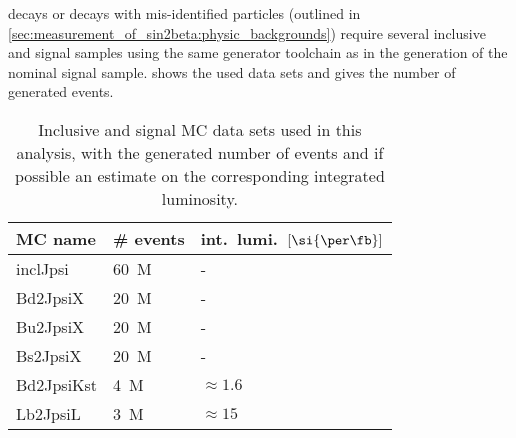 decays or decays with mis-identified particles (outlined in
\cref{sec:measurement_of_sin2beta:physic_backgrounds}) require several inclusive
and signal \MC samples using the same generator toolchain as in the generation
of the nominal signal \MC sample.
 shows
the used \MC data sets and gives the number of generated events.
%
\begin{table}
\centering
\caption{Inclusive and signal MC data sets used in this analysis, with the
generated number of events and if possible an estimate on the corresponding
integrated luminosity.}
\label{tab:measurement_of_sin2beta:data_preparation:datasamples:mc:samples}
\begin{tabular}{lll}
\toprule
\acs{MC} name & \# events & int.\ lumi.\ $[\si{\per\fb}]$ \\ 
\midrule
inclJpsi    & \SI{60}{M} & -             \\
Bd2JpsiX    & \SI{20}{M} & -             \\
Bu2JpsiX    & \SI{20}{M} & -             \\
Bs2JpsiX    & \SI{20}{M} & -             \\
Bd2JpsiKst  & \SI{4}{M}  & $\approx 1.6$ \\
Lb2JpsiL    & \SI{3}{M}  & $\approx 15$  \\
\bottomrule
\end{tabular}
\end{table}

